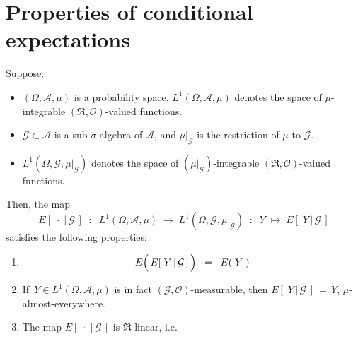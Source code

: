 

\section{Properties of conditional expectations}
\setcounter{theorem}{0}
\setcounter{equation}{0}

\renewcommand{\theenumi}{\roman{enumi}}
\renewcommand{\labelenumi}{\textnormal{(\theenumi)}$\;\;$}


\begin{theorem}
\label{Thm:PropertiesConditionalExpectation}
\mbox{}\vskip 0.2cm
\noindent
Suppose:
\begin{itemize}
\item
	$(\Omega,\mathcal{A},\mu)$ is a probability space.
	$L^{1}\!\left(\Omega,\mathcal{A},\mu\right)$ denotes the space of $\mu$-integrable $(\Re,\mathcal{O})$-valued functions.
\item
	$\mathcal{G} \subset \mathcal{A}$ is a sub-$\sigma$-algebra of $\mathcal{A}$,
	and $\mu\vert_{\mathcal{G}}$ is the restriction of $\mu$ to $\mathcal{G}$.
\item
	$L^{1}\!\left(\Omega,\mathcal{G},\mu\vert_{\mathcal{G}}\right)$ denotes the space of
	$(\mu\vert_{\mathcal{G}})$-integrable $(\Re,\mathcal{O})$-valued functions.
\end{itemize}
Then, the map
\begin{equation*}
E\!\left[\;\cdot\;\vert\,\mathcal{G}\,\right]
\;\; :\;\;
L^{1}\!\left(\Omega,\mathcal{A},\mu\right) \;\longrightarrow\; L^{1}\!\left(\Omega,\mathcal{G},\mu\vert_{\mathcal{G}}\right)
\;\; : \;\;
Y \;\longmapsto\; E\!\left[\;Y\,\vert\,\mathcal{G}\,\right]
\end{equation*}
satisfies the following properties:
\begin{enumerate}
\item
	\begin{equation*}
	E\!\left(\,\overset{{\color{white}.}}{E}\!\left[\;Y\,\vert\,\mathcal{G}\,\right]\,\right)
	\;\; = \;\;
	E\!\left(\;Y\;\right)	
	\end{equation*}
\item
	If \,$Y \in L^{1}\!\left(\Omega,\mathcal{A},\mu\right)$
	is in fact $(\mathcal{G},\mathcal{O})$-measurable,
	then $E\!\left[\;Y\,\vert\,\mathcal{G}\,\right] \,=\, Y$,
	$\mu$-almost-everywhere.
\item\label{ConditionalExpectationRLinearity}
	The map $E\!\left[\;\cdot\;\vert\,\mathcal{G}\,\right]$ is $\Re$-linear, i.e.

\end{enumerate}
\end{theorem}
